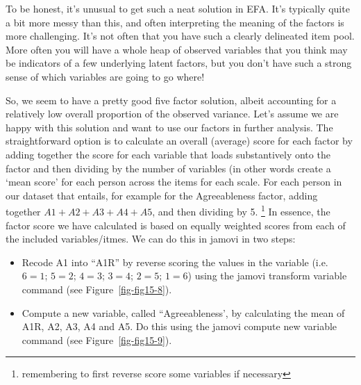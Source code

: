 \documentclass[
  a4paper,
]{book}
\begin{document}
To be honest, it's unusual to get such a neat solution in EFA. It's
typically quite a bit more messy than this, and often interpreting the
meaning of the factors is more challenging. It's not often that you have
such a clearly delineated item pool. More often you will have a whole
heap of observed variables that you think may be indicators of a few
underlying latent factors, but you don't have such a strong sense of
which variables are going to go where!

So, we seem to have a pretty good five factor solution, albeit
accounting for a relatively low overall proportion of the observed
variance. Let's assume we are happy with this solution and want to use
our factors in further analysis. The straightforward option is to
calculate an overall (average) score for each factor by adding together
the score for each variable that loads substantively onto the factor and
then dividing by the number of variables (in other words create a `mean
score' for each person across the items for each scale. For each person
in our dataset that entails, for example for the Agreeableness factor,
adding together \(A1 + A2 + A3 + A4 + A5\), and then dividing by 5.
\footnote{remembering to first reverse score some variables if necessary}
In essence, the factor score we have calculated is based on equally
weighted scores from each of the included variables/itmes. We can do
this in jamovi in two steps:

\begin{itemize}
\item
  Recode A1 into ``A1R'' by reverse scoring the values in the variable
  (i.e.~\(6 = 1\); \(5 = 2\); \(4 = 3\); \(3 = 4\); \(2 = 5\);
  \(1 = 6\)) using the jamovi transform variable command (see
  Figure~\ref{fig-fig15-8}).
\item
  Compute a new variable, called ``Agreeableness', by calculating the
  mean of A1R, A2, A3, A4 and A5. Do this using the jamovi compute new
  variable command (see Figure~\ref{fig-fig15-9}).
\end{itemize}
\end{document}
